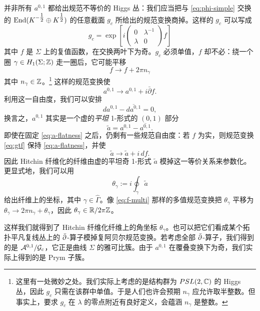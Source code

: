 并非所有 $a^{0,1}$ 都给出规范不等价的 Higgs 丛：我们应当把与 \eqref{eq:phi-simple} 交换的 $\operatorname{End}(K^{-\tfrac{1}{2}}\oplus K^{\tfrac{1}{2}})$ 的任意截面 $g_c$ 所给出的规范变换商掉。这样的 $g_c$ 可以写成
\begin{equation}
g_c = \exp\left[i\begin{pmatrix} 0 & \lambda^{-1} \\ \lambda & 0 \end{pmatrix} f\right]
\end{equation}
其中 $f$ 是 $\Sigma$ 上的复值函数，在交换两叶下为奇。$g_c$ 必须单值，$f$ 却不必：绕一个圈 $\gamma\in H_1(\Sigma;\mathbb{Z})$ 走一圈后，它可能平移
\begin{equation} \label{eq:f-multi}
f \to f + 2\pi n_\gamma
\end{equation}
其中 $n_\gamma\in\mathbb{Z}$。\footnote{这里有一处微妙之处。我们实际上考虑的是结构群为 $PSL(2,\mathbb{C})$ 的 Higgs 丛，因此 $g_c$ 只需在该群中单值。于是人们也许会预期 $n_\gamma$ 应允许取半整数。但事实上，要求 $g_c$ 在 $\lambda$ 的零点附近有良好定义，会蕴涵 $n_\gamma$ 是整数。} 这样的规范变换使
\begin{equation} \label{eq:gtf}
a^{0,1} \to a^{0,1} + i\bar\partial f.
\end{equation}
利用这一自由度，我们可以安排
\begin{equation} \label{eq:a-flatness}
d a^{0,1} - \overline{d a^{0,1}} = 0,
\end{equation}
换言之，$a^{0,1}$ 其实是一个虚的\emph{平坦} 1-形式的 $(0,1)$ 部分
\begin{equation}
\tilde a = a^{0,1} - \overline{a^{0,1}}.
\end{equation}
即使在固定 \eqref{eq:a-flatness} 之后，仍剩有一些规范自由度：若 $f$ 为实，则规范变换 \eqref{eq:gtf} 保持 \eqref{eq:a-flatness}，并使
\begin{equation}
\tilde a \to \tilde a + i\,df.
\end{equation}
因此 Hitchin 纤维化的纤维由虚的平坦奇 1-形式 $\tilde a$ 模掉这一等价关系来参数化。更显式地，我们可以用
\begin{equation}
\theta_\gamma := i\oint_\gamma\tilde a
\end{equation}
给出纤维上的坐标，其中 $\gamma\in\hat\Gamma$。像 \eqref{eq:f-multi} 那样的多值规范变换把 $\theta_\gamma$ 平移为 $\theta_\gamma\to2\pi n_\gamma+\theta_\gamma$，因此 $\theta_\gamma\in\mathbb{R}/2\pi\mathbb{Z}$。

这样我们就得到了 Hitchin 纤维化纤维上的角坐标 $\theta_\gamma$。也可以把它们看成某个拓扑平凡复线丛上的 $\bar\partial$-算子模掉复阿贝尔规范变换。若考虑全部 $\bar\partial$-算子，我们得到的是 $\mathcal{A}^{0,1}/\mathcal{G}_c$，它正是曲线 $\Sigma$ 的雅可比簇。由于 $a^{0,1}$ 在覆叠变换下为奇，我们实际上得到的是 Prym 子簇。


